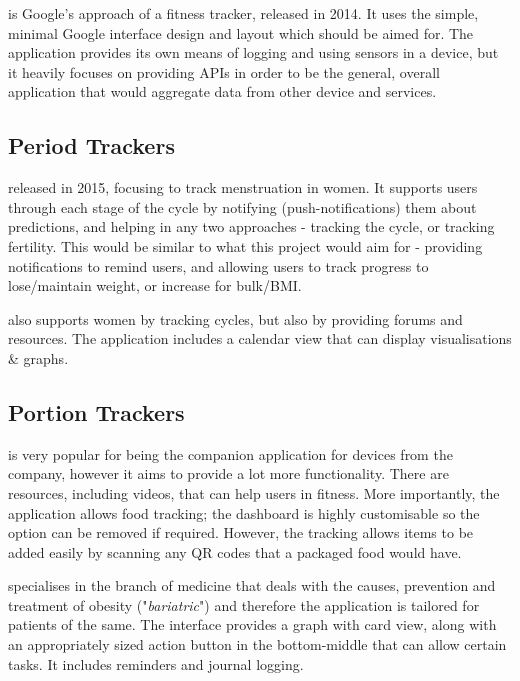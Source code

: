 \documentclass[../main.tex]{subfiles}
\begin{document}
\textbf{} is Google's approach of a fitness tracker, released in 2014. It uses the simple, minimal Google interface design and layout which should be aimed for. The application provides its own means of logging and using sensors in a device, but it heavily focuses on providing APIs in order to be the general, overall application that would aggregate data from other device and services.

\subsection*{Period Trackers}

\textbf{} released in 2015, focusing to track menstruation in women. It supports users through each stage of the cycle by notifying (push-notifications) them about predictions, and helping in any two approaches - tracking the cycle, or tracking fertility. This would be similar to what this project would aim for - providing notifications to remind users, and allowing users to track progress to lose/maintain weight, or increase for bulk/BMI.

\textbf{} also supports women by tracking cycles, but also by providing forums and resources. The application includes a calendar view that can display visualisations \& graphs.

\subsection*{Portion Trackers}

\textbf{} is very popular for being the companion application for devices from the company, however it aims to provide a lot more functionality. There are resources, including videos, that can help users in fitness. More importantly, the application allows food tracking; the dashboard is highly customisable so the option can be removed if required. However, the tracking allows items to be added easily by scanning any QR codes that a packaged food would have.

\textbf{} specialises in the branch of medicine that deals with the causes, prevention and treatment of obesity ("\textit{bariatric}") and therefore the application is tailored for patients of the same. The interface provides a graph with card view, along with an appropriately sized action button in the bottom-middle that can allow certain tasks. It includes reminders and journal logging.
\end{document}
